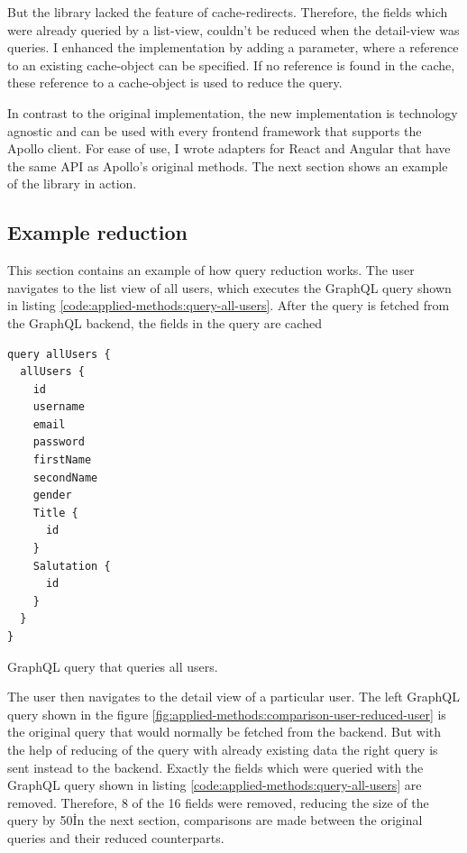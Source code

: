 But the library lacked the feature of cache-redirects. Therefore, the fields which were already queried by a list-view, couldn't be reduced when the detail-view was queries. I enhanced the implementation by adding a parameter, where a reference to an existing cache-object can be specified. If no reference is found in the cache, these reference to a cache-object is used to reduce the query.

In contrast to the original implementation, the new implementation is technology agnostic and can be used with every frontend framework that supports the Apollo client. For ease of use, I wrote adapters for React and Angular that have the same API as Apollo's original methods. The next section shows an example of the library in action.

\subsection{Example reduction}

This section contains an example of how query reduction works. The user navigates to the list view of all users, which executes the GraphQL query shown in listing \ref{code:applied-methods:query-all-users}. After the query is fetched from the GraphQL backend, the fields in the query are cached

\ifshowListings
\begin{listing}[H]
\begin{verbatim}
query allUsers {
  allUsers {
    id
    username
    email
    password
    firstName
    secondName
    gender
    Title {
      id
    }
    Salutation {
      id
    }
  }
}
\end{verbatim}
\caption{GraphQL query that queries all users.}\label{code:applied-methods:query-all-users}
\end{listing}
\fi

The user then navigates to the detail view of a particular user. The left GraphQL query shown in the figure \ref{fig:applied-methods:comparison-user-reduced-user} is the original query that would normally be fetched from the backend. But with the help of reducing of the query with already existing data the right query is sent instead to the backend. Exactly the fields which were queried with the GraphQL query shown in listing \ref{code:applied-methods:query-all-users} are removed. Therefore, 8 of the 16 fields were removed, reducing the size of the query by 50\. In the next section, comparisons are made between the original queries and their reduced counterparts.

